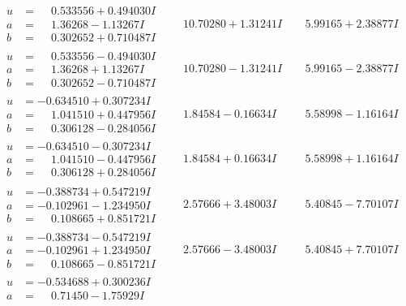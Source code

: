 \documentclass[1p]{elsarticle_modified}
\theoremstyle{definition}
\begin{document}
$$\begin{array}{c|c|c}
\begin{aligned}
u &= \phantom{-}0.533556 + 0.494030 I \\
a &= \phantom{-}1.36268 - 1.13267 I \\
b &= \phantom{-}0.302652 + 0.710487 I\end{aligned}
 & \phantom{-}10.70280 + 1.31241 I & \phantom{-}5.99165 + 2.38877 I \\ \hline\begin{aligned}
u &= \phantom{-}0.533556 - 0.494030 I \\
a &= \phantom{-}1.36268 + 1.13267 I \\
b &= \phantom{-}0.302652 - 0.710487 I\end{aligned}
 & \phantom{-}10.70280 - 1.31241 I & \phantom{-}5.99165 - 2.38877 I \\ \hline\begin{aligned}
u &= -0.634510 + 0.307234 I \\
a &= \phantom{-}1.041510 + 0.447956 I \\
b &= \phantom{-}0.306128 - 0.284056 I\end{aligned}
 & \phantom{-}1.84584 - 0.16634 I & \phantom{-}5.58998 - 1.16164 I \\ \hline\begin{aligned}
u &= -0.634510 - 0.307234 I \\
a &= \phantom{-}1.041510 - 0.447956 I \\
b &= \phantom{-}0.306128 + 0.284056 I\end{aligned}
 & \phantom{-}1.84584 + 0.16634 I & \phantom{-}5.58998 + 1.16164 I \\ \hline\begin{aligned}
u &= -0.388734 + 0.547219 I \\
a &= -0.102961 - 1.234950 I \\
b &= \phantom{-}0.108665 + 0.851721 I\end{aligned}
 & \phantom{-}2.57666 + 3.48003 I & \phantom{-}5.40845 - 7.70107 I \\ \hline\begin{aligned}
u &= -0.388734 - 0.547219 I \\
a &= -0.102961 + 1.234950 I \\
b &= \phantom{-}0.108665 - 0.851721 I\end{aligned}
 & \phantom{-}2.57666 - 3.48003 I & \phantom{-}5.40845 + 7.70107 I \\ \hline\begin{aligned}
u &= -0.534688 + 0.300236 I \\
a &= \phantom{-}0.71450 - 1.75929 I \\

\end{aligned}
\end{array}$$
\end{document}
